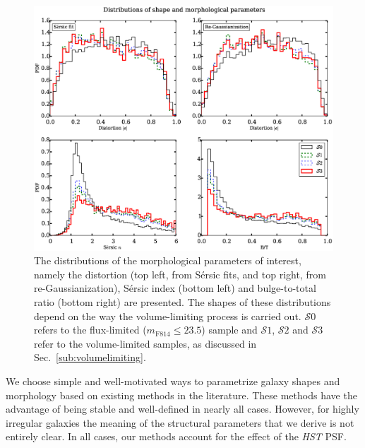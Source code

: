 \documentclass[twocolumn,useAMS,usenatbib]{mn2e}
\newcommand{\sersic}{S\'{e}rsic }
\newcommand{\s}{\ensuremath{\mathcal{S}}}
\begin{document}
\begin{figure}
 \centering
 \includegraphics[width=2.2\columnwidth]{sample_histograms}
 \caption{The distributions of the morphological parameters of interest, namely the distortion (top left, from \sersic fits, and top right, from re-Gaussianization), \sersic index (bottom left) and bulge-to-total ratio (bottom right) are presented. 
          The shapes of these distributions depend on the way the volume-limiting process is carried out. \s$0$ refers to the flux-limited ($m_\text{F814}\le23.5$) sample
          and \s$1$, \s$2$ and \s$3$ refer to the volume-limited
          samples, as discussed in
          Sec.~\ref{sub:volumelimiting}. 
  }
  \label{fig:sample_histograms}
\end{figure}


We choose simple and well-motivated ways to parametrize galaxy shapes
and morphology based on existing methods in the literature.  These
methods have the advantage of being stable and well-defined in nearly
all cases.  However, for highly irregular galaxies the meaning of the
structural parameters that we derive is not entirely clear.  In all
cases, our methods account for the effect of the {\em HST} PSF.
\end{document}

